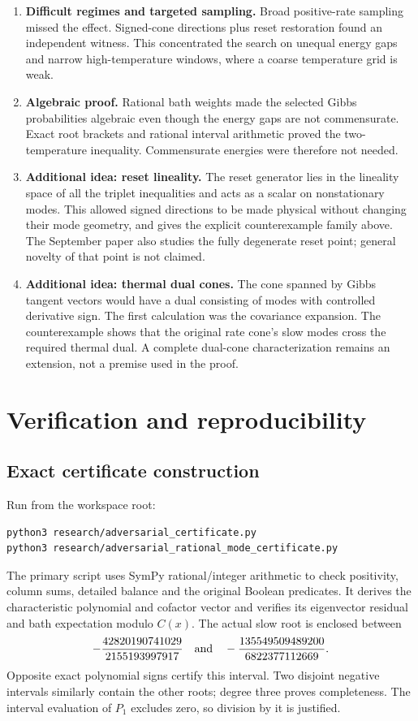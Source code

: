 \documentclass[11pt]{article}
\begin{document}
\begin{enumerate}
\item \textbf{Difficult regimes and targeted sampling.} Broad positive-rate sampling missed the effect. Signed-cone directions plus reset restoration found an independent witness. This concentrated the search on unequal energy gaps and narrow high-temperature windows, where a coarse temperature grid is weak.
\item \textbf{Algebraic proof.} Rational bath weights made the selected Gibbs probabilities algebraic even though the energy gaps are not commensurate. Exact root brackets and rational interval arithmetic proved the two-temperature inequality. Commensurate energies were therefore not needed.
\item \textbf{Additional idea: reset lineality.} The reset generator lies in the lineality space of all the triplet inequalities and acts as a scalar on nonstationary modes. This allowed signed directions to be made physical without changing their mode geometry, and gives the explicit counterexample family above. The September paper also studies the fully degenerate reset point; general novelty of that point is not claimed.
\item \textbf{Additional idea: thermal dual cones.} The cone spanned by Gibbs tangent vectors would have a dual consisting of modes with controlled derivative sign. The first calculation was the covariance expansion. The counterexample shows that the original rate cone's slow modes cross the required thermal dual. A complete dual-cone characterization remains an extension, not a premise used in the proof.
\end{enumerate}

\section{Verification and reproducibility}
\subsection{Exact certificate construction}
Run from the workspace root:
\begin{verbatim}
python3 research/adversarial_certificate.py
python3 research/adversarial_rational_mode_certificate.py
\end{verbatim}
The primary script uses SymPy rational/integer arithmetic to check positivity, column sums, detailed balance and the original Boolean predicates. It derives the characteristic polynomial and cofactor vector and verifies its eigenvector residual and bath expectation modulo $C(x)$. The actual slow root is enclosed between
\[
-\frac{42820190741029}{2155193997917}
\quad\hbox{and}\quad
-\frac{135549509489200}{6822377112669}.
\]
Opposite exact polynomial signs certify this interval. Two disjoint negative intervals similarly contain the other roots; degree three proves completeness. The interval evaluation of $P_1$ excludes zero, so division by it is justified.
\end{document}
